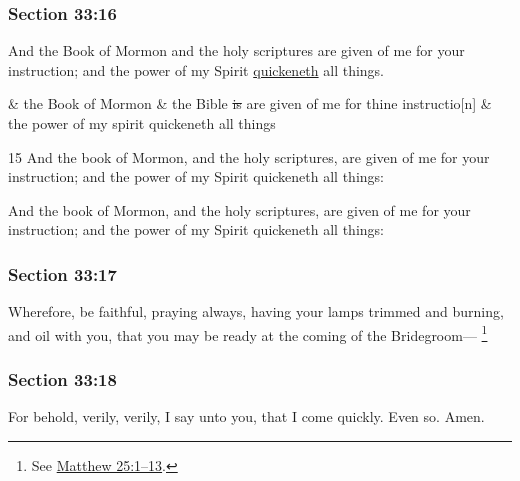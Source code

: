 	\subsubsection{Section 33:16} %
		\label{DC33-16}

		And the Book of Mormon and the holy scriptures are given of me for your instruction; and the power of my Spirit \hyperref[QUICKEN]{quickeneth} all things.

		\begin{framed}
		\scriptsize
			\begin{compactdesc}
				\item[JSP] \& the Book of Mormon \& the Bible \sout{is} are given of me for thine instructio[n] \& the power of my spirit quickeneth all things
				\item[BC] 15 And the book of Mormon, and the holy scriptures, are given of me for your instruction; and the power of my Spirit quickeneth all things:
				\item[DC 1835] And the book of Mormon, and the holy scriptures, are given of me for your instruction; and the power of my Spirit quickeneth all things:
			\end{compactdesc}
		\end{framed}

	\subsubsection{Section 33:17} %
		\label{DC33-17}

		Wherefore, be faithful, praying always, having your lamps trimmed and burning, and oil with you, that you may be ready at the coming of the Bridegroom---%
			\footnote{%
				See \hyperref[MATTHEW-25-1]{Matthew 25:1--13}.
				}


	\subsubsection{Section 33:18} %
		\label{DC33-18}

		For behold, verily, verily, I say unto you, that I come quickly.  Even so.  Amen.

